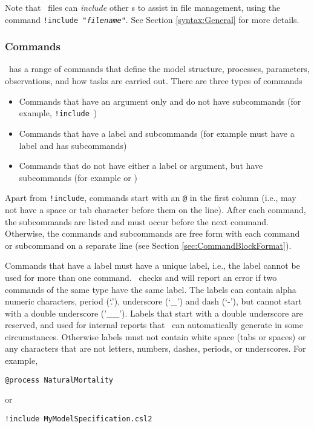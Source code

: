 Note that \config\ files can \emph{include} other \config s to assist in file management, using the command \texttt{!include "\emph{filename}"}. See Section \ref{syntax:General} for more details.

\subsubsection{Commands}

\CNAME\ has a range of commands that define the model structure, processes, parameters, observations, and how tasks are carried out. There are three types of commands

\begin{itemize}
	\item Commands that have an argument only and do not have subcommands (for example, \texttt{!include}\ )
	\item Commands that have a label and subcommands (for example  must have a label and has subcommands)
	\item Commands that do not have either a label or argument, but have subcommands (for example  or )
\end{itemize}

Apart from \texttt{!include}, commands start with an \texttt{@} in the first column (i.e., may not have a space or tab character before them on the line). After each command, the subcommands are listed and must occur before the next command. Otherwise, the commands and subcommands are free form with each command or subcommand on a separate line (see Section \ref{sec:CommandBlockFormat}).

Commands that have a label must have a unique label, i.e., the label cannot be used for more than one command. \CNAME\ checks and will report an error if two commands of the same type have the same label. The labels can contain alpha numeric characters, period (`.'), underscore (`\_') and dash (`-'), but cannot start with a double underscore ('\_\_'). Labels that start with a double underscore are reserved, and used for internal reports that \CNAME\ can automatically generate in some circumstances. Otherwise labels must not contain white space (tabs or spaces) or any characters that are not letters, numbers, dashes, periods, or underscores. For example,

{\small{\begin{verbatim}
@process NaturalMortality
\end{verbatim}}}
or
{\small{\begin{verbatim}
!include MyModelSpecification.csl2
\end{verbatim}}}

